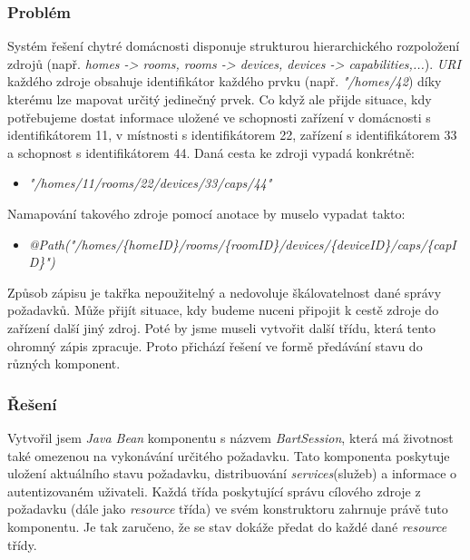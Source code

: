 \subsubsection*{Problém}
Systém řešení chytré domácnosti disponuje strukturou hierarchického rozpoložení zdrojů (např. \emph{homes -> rooms, rooms -> devices, devices -> capabilities,...}).
\emph{URI} každého zdroje obsahuje identifikátor každého prvku (např. \emph{"/homes/42}) díky kterému lze mapovat určitý jedinečný prvek.
Co když ale přijde situace, kdy potřebujeme dostat informace uložené ve schopnosti zařízení v domácnosti s identifikátorem 11, v místnosti s identifikátorem 22, zařízení s identifikátorem 33 a schopnost s identifikátorem 44.
\newline
Daná cesta ke zdroji vypadá konkrétně:
\begin{itemize}
  \item \emph{"/homes/11/rooms/22/devices/33/caps/44"}
\end{itemize}

Namapování takového zdroje pomocí anotace  by muselo vypadat takto:
\begin{itemize}
  \item \emph{@Path("/homes/\{homeID\}/rooms/\{roomID\}/devices/\{deviceID\}/caps/\{capID\}")}
\end{itemize}

Způsob zápisu je takřka nepoužitelný a nedovoluje škálovatelnost dané správy požadavků.
Může přijít situace, kdy budeme nuceni připojit k cestě zdroje do zařízení další jiný zdroj.
Poté by jsme museli vytvořit další třídu, která tento ohromný zápis zpracuje.
Proto přichází řešení ve formě předávání stavu do různých komponent.

\subsubsection*{Řešení}
Vytvořil jsem \emph{Java Bean} komponentu s názvem \emph{BartSession}, která má životnost také omezenou na vykonávání určitého požadavku.
Tato komponenta poskytuje uložení aktuálního stavu požadavku, distribuování \emph{services}(služeb) a informace o autentizovaném uživateli.
Každá třída poskytující správu cílového zdroje z požadavku (dále jako \emph{resource} třída) ve svém konstruktoru zahrnuje právě tuto komponentu.
Je tak zaručeno, že se stav dokáže předat do každé dané \emph{resource} třídy.


